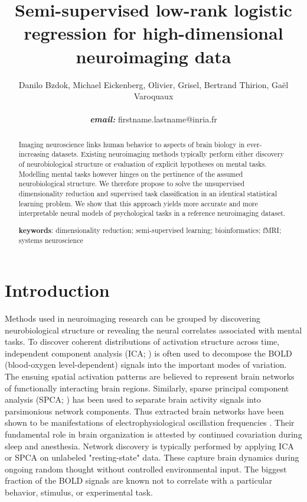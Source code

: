 \documentclass{article} %
\title{Semi-supervised low-rank logistic regression for
high-dimensional neuroimaging data}
\begin{document}
\maketitle

\author{Danilo Bzdok, Michael Eickenberg, Olivier, Grisel,
  Bertrand Thirion,
  Ga\"el Varoquaux \\\\\textbf{\textit{email:} }firstname.lastname@inria.fr}

\begin{abstract}
Imaging neuroscience links human behavior to aspects of brain
biology in ever-increasing datasets.
%
Existing neuroimaging methods typically perform either discovery of
neurobiological structure or evaluation of explicit hypotheses on mental tasks.
%
Modelling mental tasks however hinges
on the pertinence of the assumed neurobiological structure.
%
We therefore propose to solve the unsupervised dimensionality reduction
and supervised task classification in
an identical statistical learning problem.
%
We show that this approach yields more accurate and more interpretable
neural models of psychological tasks in a reference neuroimaging dataset.
%

\textbf{keywords}: dimensionality reduction; semi-supervised learning;
bioinformatics; fMRI; systems neuroscience

\end{abstract}


\section{Introduction}
%
Methods used in neuroimaging research can be grouped by discovering
neurobiological structure or revealing the neural correlates associated
with mental tasks.
To discover coherent distributions of activation structure across time,
independent component analysis (ICA; \cite{beckmann2005}) is often used
to decompose the BOLD (blood-oxygen level-dependent) signals into the
important modes of variation.
The ensuing spatial activation patterns are believed to represent
brain networks of
functionally interacting brain regions.
Similarly, sparse principal component analysis (SPCA; \cite{varoqu2011})
has been used to
separate brain activity signals into parsimonious network components.
Thus extracted brain networks have been shown to be
manifestations of electrophysiological oscillation frequencies \cite{hipp15}.
Their fundamental role in brain organization is
attested by continued covariation during sleep and anesthesia.
%
Network discovery is typically performed by applying ICA or SPCA on
unlabeled "resting-state" data. These capture brain dynamics
during ongoing random thought without controlled environmental input.
The biggest fraction of the BOLD signals are known
not to correlate with a particular behavior, stimulus, or experimental task. 
\end{document}
